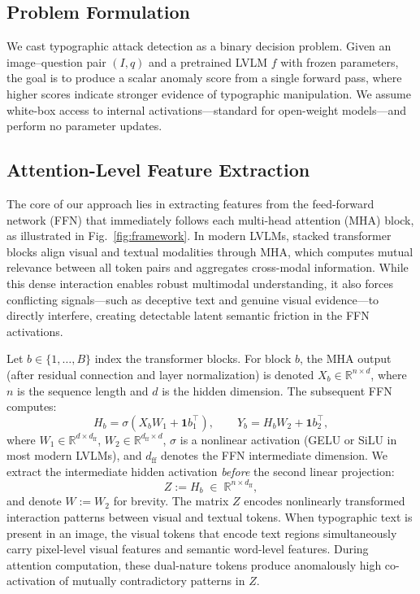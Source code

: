\documentclass[preprint,12pt]{elsarticle}
\begin{document}
\subsection{Problem Formulation}

We cast typographic attack detection as a binary decision problem. Given an image--question pair $(I, q)$ and a pretrained LVLM $f$ with frozen parameters, the goal is to produce a scalar anomaly score from a single forward pass, where higher scores indicate stronger evidence of typographic manipulation. We assume white-box access to internal activations---standard for open-weight models---and perform no parameter updates.

\subsection{Attention-Level Feature Extraction}
\label{sec:feature_extraction}

The core of our approach lies in extracting features from the feed-forward network (FFN) that immediately follows each multi-head attention (MHA) block, as illustrated in Fig.~\ref{fig:framework}. In modern LVLMs, stacked transformer blocks align visual and textual modalities through MHA, which computes mutual relevance between all token pairs and aggregates cross-modal information. While this dense interaction enables robust multimodal understanding, it also forces conflicting signals---such as deceptive text and genuine visual evidence---to directly interfere, creating detectable latent semantic friction in the FFN activations.

Let $b \in \{1, \ldots, B\}$ index the transformer blocks. For block $b$, the MHA output (after residual connection and layer normalization) is denoted $X_b \in \mathbb{R}^{n \times d}$, where $n$ is the sequence length and $d$ is the hidden dimension. The subsequent FFN computes:
\begin{equation}
H_b = \sigma(X_b W_1 + \mathbf{1} b_1^{\top}), \qquad
Y_b = H_b W_2 + \mathbf{1} b_2^{\top},
\end{equation}
where $W_1 \in \mathbb{R}^{d \times d_{\text{ff}}}$, $W_2 \in \mathbb{R}^{d_{\text{ff}} \times d}$, $\sigma$ is a nonlinear activation (GELU or SiLU in most modern LVLMs), and $d_{\text{ff}}$ denotes the FFN intermediate dimension. We extract the intermediate hidden activation \emph{before} the second linear projection:
\begin{equation}
Z := H_b \;\in\; \mathbb{R}^{n \times d_{\text{ff}}},
\end{equation}
and denote $W := W_2$ for brevity. The matrix $Z$ encodes nonlinearly transformed interaction patterns between visual and textual tokens. When typographic text is present in an image, the visual tokens that encode text regions simultaneously carry pixel-level visual features and semantic word-level features. During attention computation, these dual-nature tokens produce anomalously high co-activation of mutually contradictory patterns in $Z$.
\end{document}
